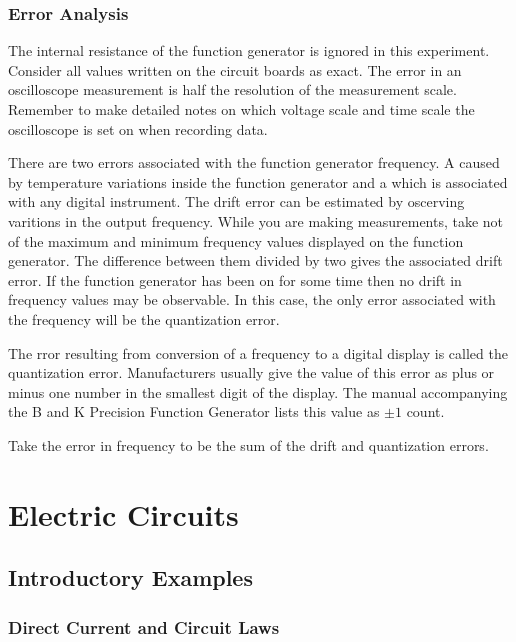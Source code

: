 \documentclass[12pt, a4paper, oneside, openright, titlepage]{book}
\begin{document}
\section{Error Analysis}

The internal resistance of the function generator is ignored in this experiment. Consider all values written on the circuit boards as exact. The error in an oscilloscope measurement is half the resolution of the measurement scale. Remember to make detailed notes on which voltage scale and time scale the oscilloscope is set on when recording data.

\noindent There are two errors associated with the function generator frequency. A  caused by temperature variations inside the function generator and a  which is associated with any digital instrument. The drift error can be estimated by oscerving varitions in the output frequency. While you are making measurements, take not of the maximum and minimum frequency values displayed on the function generator. The difference between them divided by two gives the associated drift error. If the function generator has been on for some time then no drift in frequency values may be observable. In this case, the only error associated with the frequency will be the quantization error.

\noindent The rror resulting from conversion of a frequency to a digital display is called the quantization error. Manufacturers usually give the value of this error as plus or minus one number in the smallest digit of the display. The manual accompanying the B and K Precision Function Generator lists this value as $\pm 1$ count.

\noindent Take the error in frequency to be the sum of the drift and quantization errors. 




\part{Electric Circuits}

\chapter{Introductory Examples}


\section{Direct Current and Circuit Laws}
\end{document}
